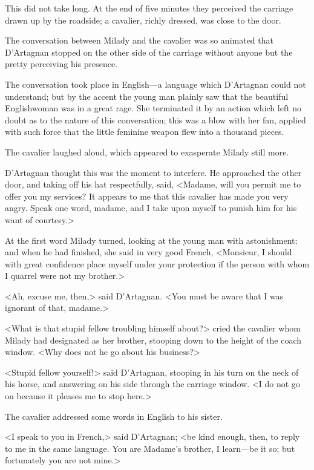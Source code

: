 This did not take long. At the end of five minutes they perceived the carriage drawn up by the roadside; a cavalier, richly dressed, was close to the door. 

The conversation between Milady and the cavalier was so animated that D'Artagnan stopped on the other side of the carriage without anyone but the pretty  perceiving his presence. 

The conversation took place in English—a language which D'Artagnan could not understand; but by the accent the young man plainly saw that the beautiful Englishwoman was in a great rage. She terminated it by an action which left no doubt as to the nature of this conversation; this was a blow with her fan, applied with such force that the little feminine weapon flew into a thousand pieces. 

The cavalier laughed aloud, which appeared to exasperate Milady still more. 

D'Artagnan thought this was the moment to interfere. He approached the other door, and taking off his hat respectfully, said, <Madame, will you permit me to offer you my services? It appears to me that this cavalier has made you very angry. Speak one word, madame, and I take upon myself to punish him for his want of courtesy.> 

At the first word Milady turned, looking at the young man with astonishment; and when he had finished, she said in very good French, <Monsieur, I should with great confidence place myself under your protection if the person with whom I quarrel were not my brother.> 

<Ah, excuse me, then,> said D'Artagnan. <You must be aware that I was ignorant of that, madame.> 

<What is that stupid fellow troubling himself about?> cried the cavalier whom Milady had designated as her brother, stooping down to the height of the coach window. <Why does not he go about his business?> 

<Stupid fellow yourself!> said D'Artagnan, stooping in his turn on the neck of his horse, and answering on his side through the carriage window. <I do not go on because it pleases me to stop here.> 

The cavalier addressed some words in English to his sister. 

<I speak to you in French,> said D'Artagnan; <be kind enough, then, to reply to me in the same language. You are Madame's brother, I learn—be it so; but fortunately you are not mine.> 

